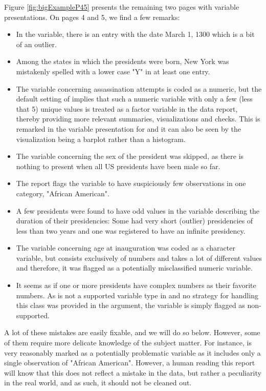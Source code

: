 \documentclass[article,shortnames]{jss}
\begin{document}
Figure \ref{fig:bigExampleP45} presents the remaining two pages with variable presentations. On pages 4 and 5, we find a few remarks:
\begin{itemize}
\item In the  variable, there is an entry with the date March 1, 1300 which is a bit of an outlier. 
\item Among the states in which the presidents were born, New York was mistakenly spelled with a lower case "Y" in at least one entry.
\item The variable concerning assassination attempts is coded as a numeric, but the default  setting of  implies that such a numeric variable with only a few (less that 5) unique values is treated as a factor variable in the data report, thereby providing more relevant summaries, visualizations and checks. This is remarked in the variable presentation for  and it can also be seen by the visualization being a barplot rather than a histogram.
\item The variable concerning the sex of the president was skipped, as there is nothing to present when all US presidents have been male so far.
\item The report flags the variable  to have suspiciously few observations in one category, "African American". 
\item A few presidents were found to have odd values in the variable describing the duration of their presidencies: Some had very short (outlier) presidencies of less than two years and one was registered to have an infinite presidency. 
\item The variable concerning age at inauguration was coded as a character variable, but consists exclusively of numbers and takes a lot of different values and therefore, it was flagged as a potentially misclassified numeric variable.
\item It seems as if one or more presidents have complex numbers as their favorite numbers. As  is not a supported variable type in  and no strategy for handling this class was provided in the  argument, the variable is simply flagged as non-supported.
\end{itemize}
A lot of these mistakes are easily fixable, and we will do so below. However, some of them require more delicate knowledge of the subject matter. For instance,  is very reasonably marked as a potentially problematic variable as it includes only a single observation of "African American". However, a human reading this report will know that this does not reflect a mistake in the data, but rather a peculiarity in the real world, and as such, it should not be cleaned out. 
\end{document}
